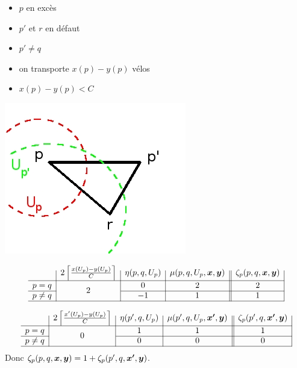 \documentclass[twoside,11pt,openany,a4paper]{rapport}
\begin{document}
\begin{minipage}{0.5\linewidth}
\begin{itemize}
\item $p$ en excès
\item $p'$ et $r$ en défaut
\item $p' \ne q$
\item on transporte $x(p)-y(p)$ vélos
\item $x(p)-y(p) < C$
\end{itemize}
\end{minipage}
\begin{minipage}{0.5\linewidth}
\begin{center}
\includegraphics[scale=0.5]{graphe_triangulaire_221.jpg}
\end{center}
\end{minipage}

\begin{gather*}
  \begin{array}{c|c|c|c||c|}
    & 2 \left\lceil \frac{x(U_p)-y(U_p)}{C} \right\rceil
    & \eta(p,q,U_p)
    & \mu(p,q,U_p,\bs{x},\bs{y})
    & \zeta_p(p,q,\bs{x},\bs{y})
    \\ \hline
    p=q
    & \multirow{2}{*}{$2$}
    & 0
    & 2
    & 2
    \\ \cline{1-1}\cline{3-5}
    p \ne q
    &
    & -1
    & 1
    & 1
    \\ \hline
  \end{array}
\end{gather*}

\begin{gather*}
  \begin{array}{c|c|c|c||c|}
    & 2 \left\lceil \frac{x'(U_p)-y(U_p)}{C} \right\rceil
    & \eta(p',q,U_p)
    & \mu(p',q,U_p,\bs{x'},\bs{y})
    & \zeta_p(p',q,\bs{x'},\bs{y})
    \\ \hline
    p=q
    & \multirow{2}{*}{$0$}
    & 1
    & 1
    & 1
    \\ \cline{1-1}\cline{3-5}
    p \ne q
    &
    & 0
    & 0
    & 0
    \\ \hline
  \end{array}
\end{gather*}
Donc $\zeta_p(p,q,\boldsymbol{x},\boldsymbol{y}) = 1 + \zeta_p(p',q,\boldsymbol{x'},\boldsymbol{y})$.
\\
\end{document}
